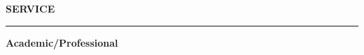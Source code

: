 \documentclass{article}
\begin{document}
%
%



\noindent \LARGE \textbf{SERVICE} \normalsize

\noindent \rule{\textwidth}{1px}

\medskip

\Large \textbf{Academic/Professional} \normalsize

\medskip
\end{document}
